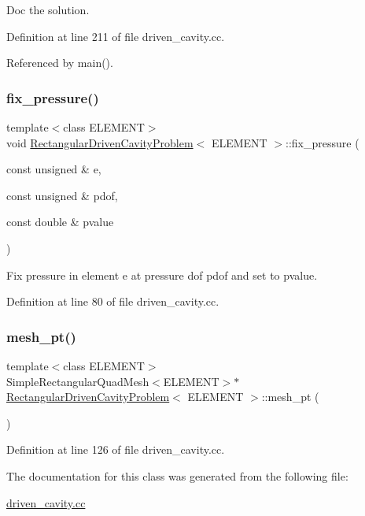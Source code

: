 Doc the solution. 



Definition at line 211 of file driven\+\_\+cavity.\+cc.



Referenced by main().

\mbox{\label{classRectangularDrivenCavityProblem_ac02d80f5241eeb04571577ce3b9f35a3}} 
\subsubsection{\texorpdfstring{fix\+\_\+pressure()}{fix\_pressure()}}
{\footnotesize\ttfamily template$<$class E\+L\+E\+M\+E\+NT$>$ \\
void \hyperlink{classRectangularDrivenCavityProblem}{Rectangular\+Driven\+Cavity\+Problem}$<$ E\+L\+E\+M\+E\+NT $>$\+::fix\+\_\+pressure (\begin{DoxyParamCaption}\item[{const unsigned \&}]{e,  }\item[{const unsigned \&}]{pdof,  }\item[{const double \&}]{pvalue }\end{DoxyParamCaption})\hspace{0.3cm}{\ttfamily [inline]}}



Fix pressure in element e at pressure dof pdof and set to pvalue. 



Definition at line 80 of file driven\+\_\+cavity.\+cc.

\mbox{\label{classRectangularDrivenCavityProblem_a408035d1f224641db75a2f48074e9593}} 
\subsubsection{\texorpdfstring{mesh\+\_\+pt()}{mesh\_pt()}}
{\footnotesize\ttfamily template$<$class E\+L\+E\+M\+E\+NT$>$ \\
Simple\+Rectangular\+Quad\+Mesh$<$E\+L\+E\+M\+E\+NT$>$$\ast$ \hyperlink{classRectangularDrivenCavityProblem}{Rectangular\+Driven\+Cavity\+Problem}$<$ E\+L\+E\+M\+E\+NT $>$\+::mesh\+\_\+pt (\begin{DoxyParamCaption}{ }\end{DoxyParamCaption})\hspace{0.3cm}{\ttfamily [inline]}}



Definition at line 126 of file driven\+\_\+cavity.\+cc.



The documentation for this class was generated from the following file\+:\begin{DoxyCompactItemize}
\item 
\hyperlink{driven__cavity_8cc}{driven\+\_\+cavity.\+cc}\end{DoxyCompactItemize}
